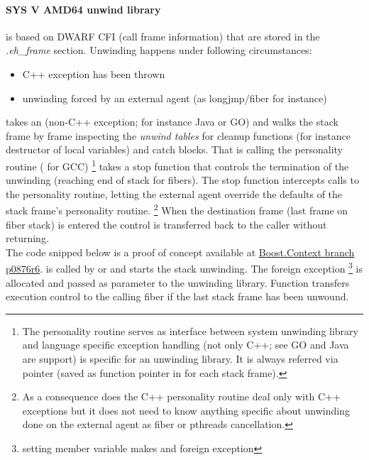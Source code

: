\paragraph{SYS V AMD64 unwind library}
is based on DWARF CFI (call frame information) that are stored in the \emph{.eh\_frame} section.
Unwinding happens under following circumstances:
\begin{itemize}
    \item C++ exception has been thrown
    \item unwinding forced by an external agent (as longjmp/fiber for instance)
\end{itemize}
\uwforced takes an \foreignex (non-C++ exception; for instance Java or GO) and walks the stack frame by frame
inspecting the \emph{unwind tables} for cleanup functions (for instance destructor of
local variables) and catch blocks. That is calling the personality routine
( for GCC)
\footnote{The personality routine serves as interface between system unwinding library
and language specific exception handling (not only C++; see GO and Java are support)
is specific for an unwinding library. It is always referred via pointer (saved
as function pointer in \ehframe for each stack frame).}
\uwforced takes a stop function that controls the termination of the unwinding
(reaching end of stack for fibers).
The stop function intercepts calls to the personality routine, letting the external
agent override the defaults of the stack frame's personality routine.
\footnote{As a consequence does the C++ personality routine deal only with C++ exceptions
but it does not need to know anything specific about unwinding done on the external agent as fiber or pthreads cancellation.}
When the destination frame (last frame on fiber
stack) is entered the control is transferred back to the caller without returning.\\

The code snipped below is a proof of concept available at \href{https://github.com/boostorg/context/tree/p0876r6}{Boost.Context branch p0876r6}.
 is called by \unwindfib or  and starts the stack unwinding.
The foreign exception \footnote{setting member variable makes  and foreign exception}
is allocated and passed as parameter to the unwinding library. Function  transfers execution control
to the calling fiber if the last stack frame has been unwound.

